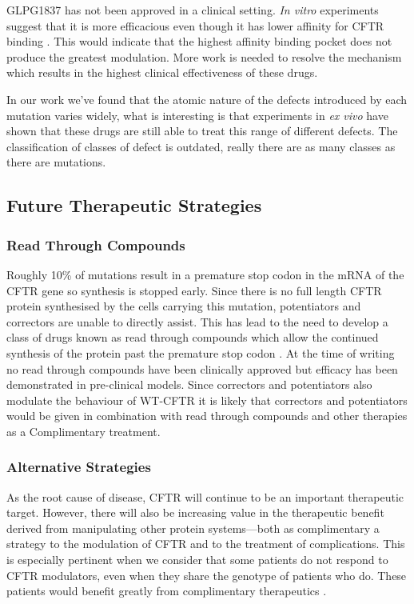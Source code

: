 GLPG1837 has not been approved in a clinical setting. \textit {In vitro} experiments suggest that it is more efficacious even though it has lower affinity for CFTR binding \cite{vanderplas2018}. This would indicate that the highest affinity binding pocket does not produce the greatest modulation. More work is needed to resolve the mechanism which results in the highest clinical effectiveness of these drugs.  

In our work we've found that the atomic nature of the defects introduced by each mutation varies widely, what is interesting is that experiments in \textit{ex vivo} have shown that these drugs are still able to treat this range of different defects. The classification of classes of defect is outdated, really there are as many classes as there are mutations.

\subsection{Future Therapeutic Strategies}
\subsubsection{Read Through Compounds}
Roughly 10\% of mutations result in a premature stop codon in the mRNA of the CFTR gene so synthesis is stopped early. Since there is no full length CFTR protein synthesised by the cells carrying this mutation, potentiators and correctors are unable to directly assist. This has lead to the need to develop a class of drugs known as read through compounds which allow the continued synthesis of the protein past the premature stop codon \cite{sharma2021}. At the time of writing no read through compounds have been clinically approved but efficacy has been demonstrated in pre-clinical models\cite{crawford2021}. Since correctors and potentiators also modulate the behaviour of WT-CFTR it is likely that correctors and potentiators would be given in combination with read through compounds and other therapies as a Complimentary treatment.

\subsubsection{Alternative Strategies}
As the root cause of disease, CFTR will continue to be an important therapeutic target. However, there will also be increasing value in the therapeutic benefit derived from manipulating other protein systems---both as complimentary a strategy to the modulation of CFTR and to the treatment of complications. This is especially pertinent when we consider that some patients do not respond to CFTR modulators, even when they share the genotype of patients who do. These patients would benefit greatly from complimentary therapeutics \cite{hanafin2021, robertson2015, lingam2017, seelig2020, barbieri2021a, grebert2019}. 

